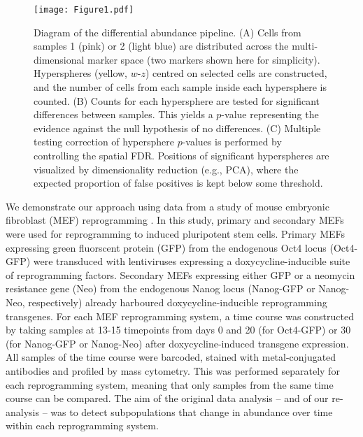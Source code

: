 \documentclass{article}
\begin{document}
\begin{figure}[bt]
\begin{center}
    \texttt{[image: Figure1.pdf]}
\end{center}
\caption{Diagram of the differential abundance pipeline.
    (A) Cells from samples 1 (pink) or 2 (light blue) are distributed across the multi-dimensional marker space (two markers shown here for simplicity).
    Hyperspheres (yellow, $w$-$z$) centred on selected cells are constructed, and the number of cells from each sample inside each hypersphere is counted.
    (B) Counts for each hypersphere are tested for significant differences between samples.
    This yields a $p$-value representing the evidence against the null hypothesis of no differences.
    (C) Multiple testing correction of hypersphere $p$-values is performed by controlling the spatial FDR.
    Positions of significant hyperspheres are visualized by dimensionality reduction (e.g., PCA), where the expected proportion of false positives is kept below some threshold.
}
\label{fig:overview}
\end{figure}

We demonstrate our approach using data from a study of mouse embryonic fibroblast (MEF) reprogramming \cite{zunder2015continuous}.
In this study, primary and secondary MEFs were used for reprogramming to induced pluripotent stem cells.
Primary MEFs expressing green fluorscent protein (GFP) from the endogenous Oct4 locus (Oct4-GFP) were transduced with lentiviruses expressing a doxycycline-inducible suite of reprogramming factors.
Secondary MEFs expressing either GFP or a neomycin resistance gene (Neo) from the endogenous Nanog locus (Nanog-GFP or Nanog-Neo, respectively) already harboured doxycycline-inducible reprogramming transgenes.
For each MEF reprogramming system, a time course was constructed by taking samples at 13-15 timepoints from days 0 and 20 (for Oct4-GFP) or 30 (for Nanog-GFP or Nanog-Neo) after doxycycline-induced transgene expression.
All samples of the time course were barcoded, stained with metal-conjugated antibodies and profiled by mass cytometry.
This was performed separately for each reprogramming system, meaning that only samples from the same time course can be compared.
The aim of the original data analysis -- and of our re-analysis -- was to detect subpopulations that change in abundance over time within each reprogramming system.
\end{document}
